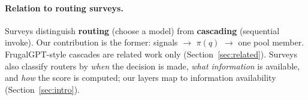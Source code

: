 \paragraph{Relation to routing surveys.}
Surveys distinguish \textbf{routing} (choose a model) from \textbf{cascading} (sequential invoke).
Our contribution is the former: signals $\to$ $\pi(q)$ $\to$ one pool member.
FrugalGPT-style cascades are related work only (Section~\ref{sec:related}).
Surveys also classify routers by \emph{when} the decision is made, \emph{what information} is available, and \emph{how} the score is computed; our layers map to information availability (Section~\ref{sec:intro}).
